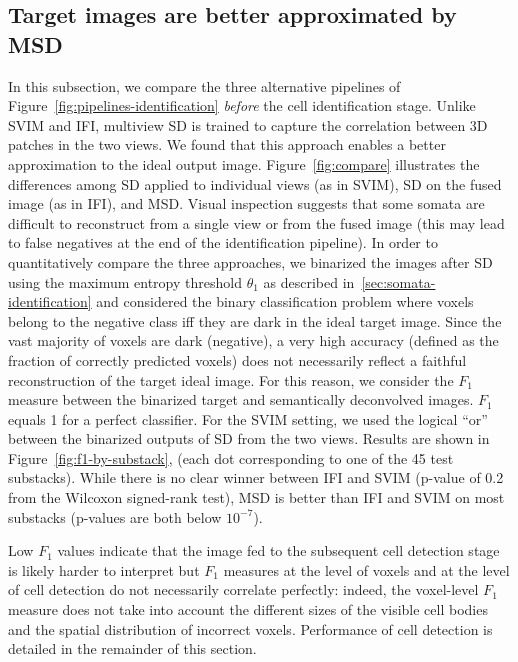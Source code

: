 \documentclass[smallextended]{svjour3}       %
\begin{document}
\subsection{Target images are better approximated by MSD}
\label{sec:MSD-is-better}
In this subsection, we compare the three alternative pipelines of
Figure~\ref{fig:pipelines-identification} \textit{before} the cell
identification stage. Unlike SVIM and IFI, multiview SD is trained to
capture the correlation between 3D patches in the two views. We found
that this approach enables a better approximation to the ideal output
image.  Figure~\ref{fig:compare} illustrates the differences among SD
applied to individual views (as in SVIM), SD on the fused image (as in
IFI), and MSD. Visual inspection suggests that some somata are
difficult to reconstruct from a single view or from the fused image
(this may lead to false negatives at the end of the identification
pipeline). In order to quantitatively compare the three approaches, we
binarized the images after SD using the maximum entropy threshold
$\theta_1$ as described in~\ref{sec:somata-identification} and
considered the binary classification problem where voxels belong to
the negative class iff they are dark in the ideal target
image. Since the vast majority of voxels are dark (negative), a very
high accuracy (defined as the fraction of correctly predicted voxels)
does not necessarily reflect a faithful reconstruction of the target
ideal image. For this reason, we consider the 
$F_1$ measure between the binarized target and semantically
deconvolved images. $F_1$ equals 1 for a perfect classifier.  For the
SVIM setting, we used the logical ``or'' between the binarized
outputs of SD from the two views. Results are shown in
Figure~\ref{fig:f1-by-substack}, (each dot corresponding to one of the
45 test substacks).  While there is no clear winner between IFI and
SVIM (p-value of 0.2 from the Wilcoxon signed-rank test),
MSD is better than IFI and SVIM on most substacks (p-values are both
below $10^{-7}$).

Low $F_1$ values indicate that the image fed to the subsequent cell
detection stage is likely harder to interpret but $F_1$ measures at the
level of voxels and at the level of cell detection do not necessarily
correlate perfectly: indeed, the voxel-level $F_1$ measure does not take
into account the different sizes of the visible cell bodies and the
spatial distribution of incorrect voxels. Performance of cell
detection is detailed in the remainder of this section.
\end{document}
